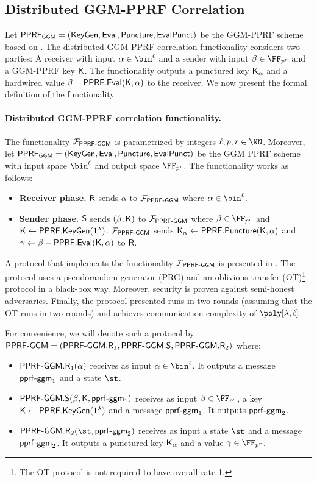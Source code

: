 \subsection{Distributed GGM-PPRF Correlation}
Let $\mathsf{PPRF}_\mathsf{GGM}=(\mathsf{KeyGen},\mathsf{Eval},\mathsf{Puncture},\mathsf{EvalPunct})$ be the GGM-PPRF scheme based on \cite{JACM:GolGolMic86}. 
The distributed GGM-PPRF correlation functionality \cite{CCS:BCGIKRS19} considers two parties: A receiver with input $\alpha\in\bin^\ell$ and a sender with input $\beta\in\FF_{p^r}$ and a GGM-PPRF key $\mathsf{K}$. The functionality outputs a punctured key $\mathsf{K}_\alpha$ and a hardwired value $\beta - \mathsf{PPRF.Eval}(\mathsf{K},\alpha)$ to the receiver. We now present the formal definition of the functionality.

\paragraph{Distributed GGM-PPRF correlation functionality.} The functionality $\mathcal{F}_{\mathsf{PPRF}\text{-}\mathsf{GGM}}$ is parametrized by integers $\ell,p,r\in\NN$. Moreover, let $\mathsf{PPRF}_\mathsf{GGM}=(\mathsf{KeyGen},\mathsf{Eval},\mathsf{Puncture},\mathsf{EvalPunct})$ be the GGM PPRF scheme with input space $\bin^\ell$ and output space $\FF_{p^r}$. The functionality works as follows:
\begin{itemize}
    \item \textbf{Receiver phase.} $\mathsf{R}$ sends $\alpha$ to  $\mathcal{F}_{\mathsf{PPRF}\text{-}\mathsf{GGM}}$ where $\alpha\in\bin^\ell$. 
    \item \textbf{Sender phase.} $\mathsf{S}$ sends $(\beta,\mathsf{K})$ to $\mathcal{F}_{\mathsf{PPRF}\text{-}\mathsf{GGM}}$ where $\beta\in\FF_{p^r}$ and $\mathsf{K}\leftarrow\mathsf{PPRF.KeyGen}(1^\lambda)$. $\mathcal{F}_{\mathsf{PPRF}\text{-}\mathsf{GGM}}$ sends $\mathsf{K}_\alpha\leftarrow\mathsf{PPRF}.\mathsf{Puncture}(\mathsf{K},\alpha)$ and $\gamma\leftarrow\beta - \mathsf{PPRF}.\mathsf{Eval}(\mathsf{K},\alpha)$ to $\mathsf{R}$.
\end{itemize}

A protocol that implements the functionality $\mathcal{F}_{\mathsf{PPRF}\text{-}\mathsf{GGM}}$ is presented in \cite{CCS:BCGIKRS19}. The protocol uses a pseudorandom generator (PRG) and an oblivious transfer (OT)\footnote{The OT protocol is not required to have overall rate 1.} protocol in a black-box way. Moreover, security is proven against semi-honest adversaries. Finally, the protocol presented runs in two rounds (assuming that the OT runs in two rounds) and achieves communication complexity of $\poly[\lambda,\ell]$.


For convenience, we will denote such a protocol by $\mathsf{PPRF}\text{-}\mathsf{GGM}=(\mathsf{PPRF}\text{-}\mathsf{GGM}.\mathsf{R}_1,\mathsf{PPRF}\text{-}\mathsf{GGM}.\mathsf{S},\mathsf{PPRF}\text{-}\mathsf{GGM}.\mathsf{R}_2)$ where: \begin{itemize}
    \item $\mathsf{PPRF}\text{-}\mathsf{GGM}.\mathsf{R}_1(\alpha)$ receives as input $\alpha\in\bin^\ell$. It outputs a message $\mathsf{pprf}\text{-}\mathsf{ggm}_1$ and a state $\st$.
    \item $\mathsf{PPRF}\text{-}\mathsf{GGM}.\mathsf{S}(\beta,\mathsf{K},\mathsf{pprf}\text{-}\mathsf{ggm}_1)$ receives as input $\beta\in\FF_{p^r}$, a key  $\mathsf{K}\leftarrow\mathsf{PPRF.KeyGen}(1^\lambda)$ and a message $\mathsf{pprf}\text{-}\mathsf{ggm}_1$. It outputs $\mathsf{pprf}\text{-}\mathsf{ggm}_2$.
    \item $\PPRFGGM.\Rs_2(\st,\pprfggm_2)$ receives as input a state $\st$ and a message $\mathsf{pprf}\text{-}\mathsf{ggm}_2$. It outputs a punctured key $\mathsf{K}_\alpha$ and a value $\gamma\in\FF_{p^r}$.
\end{itemize}


